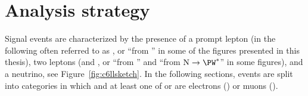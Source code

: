 \begin{table}[h!]
  \centering
  \caption{\label{tab:muonSelection} Requirements for a muon
    to pass each of the defined selection working points. Variables
    defined in Section~\ref{sec:c2variables}.}
\end{table}



\section{Analysis strategy}\label{sec:llanalisi}
Signal events are
characterized by the presence of a prompt lepton (in the following
often referred to as \lone, or ``\lept from \PW'' in some of the
figures presented in this thesis),
two \displ leptons (\ltwo and \lthree, or
``\lept from \hnl'' and ``\lept from $\hnl\to\PW^\ast$'' in some
figures), and a neutrino, see Figure~\ref{fig:c6llsketch}. In the following sections, events are split into  
categories in which \lone and at least one of \ltwo or \lthree are
electrons (\eex) or muons (\mmx).


